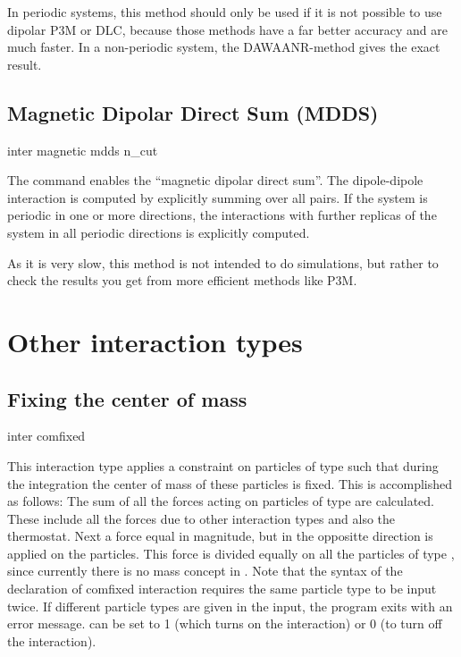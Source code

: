In periodic systems, this method should only be used if it is not possible to use dipolar P3M or
DLC, because those methods have a far better accuracy and are much faster.
In a non-periodic system, the DAWAANR-method gives the exact result.

\subsection{Magnetic Dipolar Direct Sum (MDDS)}

\begin{essyntax}
  inter magnetic  mdds n\_cut 
  \begin{features}
  \end{features}
\end{essyntax}

The command enables the ``magnetic dipolar direct sum''.  The
dipole-dipole interaction is computed by explicitly summing over all
pairs. If the system is periodic in one or more directions, the
interactions with further  replicas of the system
in all periodic directions is explicitly computed.

As it is very slow, this method is not intended to do simulations,
but rather to check the results you get from more efficient methods
like P3M.
  
\section{Other interaction types}
\label{sec:inter-other}

\subsection{Fixing the center of mass}
\begin{essyntax}
  inter   comfixed 
  \begin{features}
  \end{features}
\end{essyntax}
This interaction type applies a constraint on particles of type
 such that during the integration the center of mass of
these particles is fixed. This is accomplished as follows: The sum of
all the forces acting on particles of type  are
calculated. These include all the forces due to other interaction
types and also the thermostat. Next a force equal in magnitude, but in
the oppositte direction is applied on the particles. This force is
divided equally on all the particles of type , since
currently there is no mass concept in \es. Note that the syntax of the
declaration of comfixed interaction requires the same particle type to
be input twice. If different particle types are given in the input,
the program exits with an error message.  can be set to 1
(which turns on the interaction) or 0 (to turn off the interaction).

